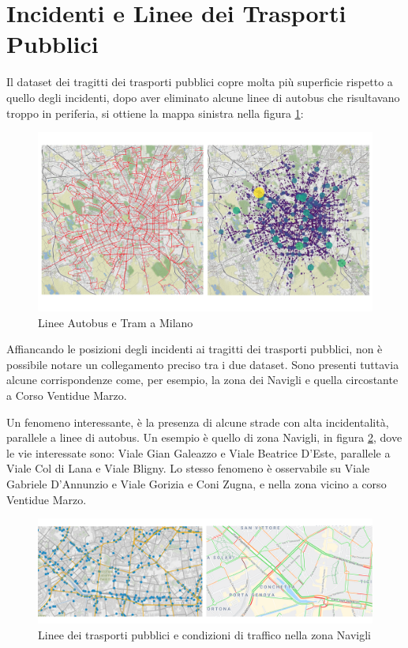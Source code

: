 \documentclass[a4paper,12pt]{report}
\begin{document}
\section{Incidenti e Linee dei Trasporti Pubblici}

Il dataset dei tragitti dei trasporti pubblici copre molta più superficie rispetto a 
quello degli incidenti, dopo aver eliminato alcune linee di autobus che risultavano 
troppo in periferia, si ottiene la mappa sinistra nella figura \ref{fig:geo-trasporti}: 

\begin{figure}
    \includegraphics[width=\linewidth]{../src/atm/linee_atm.png}
    \caption{Linee Autobus e Tram a Milano}
    \label{fig:geo-trasporti}
\end{figure}

Affiancando le posizioni degli incidenti ai tragitti dei trasporti pubblici, 
non è possibile notare un collegamento preciso tra i due dataset. 
Sono presenti tuttavia alcune corrispondenze come, per esempio, la zona dei Navigli 
e quella circostante a Corso Ventidue Marzo. 

Un fenomeno interessante, è la presenza di alcune strade con alta incidentalità, 
parallele a linee di autobus. 
Un esempio è quello di zona Navigli, in figura \ref{fig:navigli}, dove le vie interessate sono:
Viale Gian Galeazzo e Viale Beatrice D'Este, parallele a Viale Col di Lana e Viale Bligny.
Lo stesso fenomeno è osservabile su Viale Gabriele D'Annunzio e Viale Gorizia e Coni Zugna, 
e nella zona vicino a corso Ventidue Marzo.

\begin{figure}
    \includegraphics[width=\linewidth]{../src/atm/navigli.png}
    \caption{Linee dei trasporti pubblici e condizioni di traffico nella zona Navigli}
    \label{fig:navigli}
\end{figure}
\end{document}
